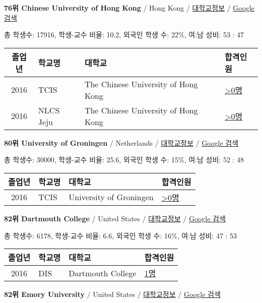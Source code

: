 \documentclass[13pt,]{article}
\begin{document}
\textbf{76위 Chinese University of Hong Kong} / Hong Kong /
\href{https://www.timeshighereducation.com/world-university-rankings/chinese-university-of-hong-kong?ranking-dataset=589595}{대학교정보}
/
\href{http://www.google.com/search?q=Chinese+University+of+Hong+Kong}{Google
검색}

총 학생수: 17916, 학생-교수 비율: 10.2, 외국인 학생 수: 22\%, 여:남
성비: 53 : 47

\begin{longtable}[]{@{}clll@{}}
\toprule
졸업년 & 학교명 & 대학교 & 합격인원\tabularnewline
\midrule
\endhead
2016 & TCIS & The Chinese University of Hong Kong &
\href{http://cafe.naver.com/assarabia/11598}{\textgreater{}0명}\tabularnewline
2016 & NLCS Jeju & The Chinese University of Hong Kong &
\href{http://cafe.naver.com/assarabia/11592}{\textgreater{}0명}\tabularnewline
\bottomrule
\end{longtable}

\textbf{80위 University of Groningen} / Netherlands /
\href{https://www.timeshighereducation.com/world-university-rankings/university-of-groningen?ranking-dataset=589595}{대학교정보}
/ \href{http://www.google.com/search?q=University+of+Groningen}{Google
검색}

총 학생수: 30000, 학생-교수 비율: 25.6, 외국인 학생 수: 15\%, 여:남
성비: 52 : 48

\begin{longtable}[]{@{}clll@{}}
\toprule
졸업년 & 학교명 & 대학교 & 합격인원\tabularnewline
\midrule
\endhead
2016 & TCIS & University of Groningen &
\href{http://cafe.naver.com/assarabia/11598}{\textgreater{}0명}\tabularnewline
\bottomrule
\end{longtable}

\textbf{82위 Dartmouth College} / United States /
\href{https://www.timeshighereducation.com/world-university-rankings/dartmouth-college?ranking-dataset=589595}{대학교정보}
/ \href{http://www.google.com/search?q=Dartmouth+College}{Google 검색}

총 학생수: 6178, 학생-교수 비율: 6.6, 외국인 학생 수: 16\%, 여:남 성비:
47 : 53

\begin{longtable}[]{@{}clll@{}}
\toprule
졸업년 & 학교명 & 대학교 & 합격인원\tabularnewline
\midrule
\endhead
2016 & DIS & Dartmouth College &
\href{http://cafe.naver.com/assarabia/11591}{1명}\tabularnewline
\bottomrule
\end{longtable}

\textbf{82위 Emory University} / United States /
\href{https://www.timeshighereducation.com/world-university-rankings/emory-university?ranking-dataset=589595}{대학교정보}
/ \href{http://www.google.com/search?q=Emory+University}{Google 검색}
\end{document}
